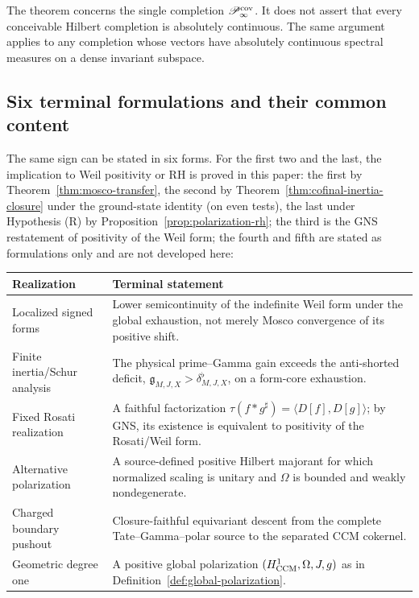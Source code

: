 \documentclass[11pt]{amsart}
\theoremstyle{definition}
\theoremstyle{remark}
\begin{document}
The theorem concerns the single completion \(\mathscr P_\infty^{\rm cov}\).
It does not assert that every conceivable Hilbert completion is absolutely
continuous.  The same argument applies to any completion whose vectors
have absolutely continuous spectral measures on a dense invariant
subspace.

\subsection{Six terminal formulations and their common content}
\label{subsec:six-terminal}

The same sign can be stated in six forms.  For the first two and the last,
the implication to Weil positivity or RH is proved in this paper: the first
by Theorem~\ref{thm:mosco-transfer}, the second by
Theorem~\ref{thm:cofinal-inertia-closure} under the ground-state identity
(on even tests),
the last under Hypothesis (R) by Proposition~\ref{prop:polarization-rh}; the third is
the GNS restatement of positivity of the Weil form; the fourth and fifth
are stated as formulations only and are not developed here:
\begin{center}
\renewcommand{\arraystretch}{1.2}
\begin{tabular}{>{\raggedright\arraybackslash}p{}
                >{\raggedright\arraybackslash}p{}}
\toprule
Realization & Terminal statement\\
\midrule
Localized signed forms & Lower semicontinuity of the indefinite Weil form
under the global exhaustion, not merely Mosco convergence of its positive
shift.\\
Finite inertia/Schur analysis & The physical prime--Gamma gain exceeds the
anti-shorted deficit, \(\mathfrak g_{M,J,X}>\delta^{\flat}_{M,J,X}\), on a
form-core exhaustion.\\
Fixed Rosati realization & A faithful factorization
\(\tau(f*g^\sharp)=\langle D[f],D[g]\rangle\); by GNS, its existence is
equivalent to positivity of the Rosati/Weil form.\\
Alternative polarization & A source-defined positive Hilbert majorant for
which normalized scaling is unitary and \(\Omega\) is bounded and weakly
nondegenerate.\\
Charged boundary pushout & Closure-faithful equivariant descent from the
complete Tate--Gamma--polar source to the separated CCM cokernel.\\
Geometric degree one & A positive global polarization
\((H^1_{\rm CCM},\Omega,J,g)\) as in Definition~\ref{def:global-polarization}.\\
\bottomrule
\end{tabular}
\end{center}
\end{document}
